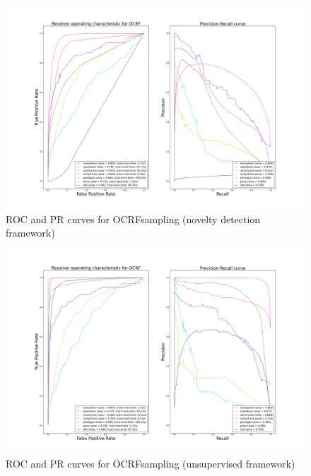 \begin{figure}[!ht]
  \caption{ROC and PR curves for OCRFsampling (novelty detection framework)}
  \label{ocrf:fig:ocrfm_roc_pr}
  \centering
  \includegraphics[trim=175 80 175 123, clip, width=\linewidth]{fig_source/ocrf_fig/bench_ocrf_roc_pr_supervised_factorized.png}
\end{figure}
\begin{figure}[!ht]
  \caption{ROC and PR curves for OCRFsampling (unsupervised framework)}
  \label{ocrf:fig:ocrfm_roc_pr_unsupervised}
  \centering
  \includegraphics[trim=175 80 175 123, clip, width=\linewidth]{fig_source/ocrf_fig/bench_ocrf_roc_pr_unsupervised_factorized.png}
\end{figure}


